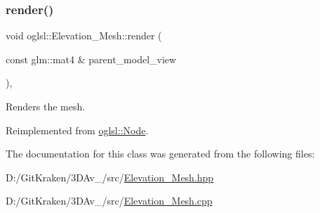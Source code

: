 \mbox{\label{classoglsl_1_1_elevation___mesh_afb39dc1633680dccabb4b8da72ac4733}} 
\subsubsection{\texorpdfstring{render()}{render()}}
{\footnotesize\ttfamily void oglsl\+::\+Elevation\+\_\+\+Mesh\+::render (\begin{DoxyParamCaption}\item[{const glm\+::mat4 \&}]{parent\+\_\+model\+\_\+view }\end{DoxyParamCaption})\hspace{0.3cm}{\ttfamily [override]}, {\ttfamily [virtual]}}



Renders the mesh. 



Reimplemented from \mbox{\hyperlink{classoglsl_1_1_node_a09545b18a2d798327601a6251c091444}{oglsl\+::\+Node}}.



The documentation for this class was generated from the following files\+:\begin{DoxyCompactItemize}
\item 
D\+:/\+Git\+Kraken/3\+D\+Av\+\_/src/\mbox{\hyperlink{_elevation___mesh_8hpp}{Elevation\+\_\+\+Mesh.\+hpp}}\item 
D\+:/\+Git\+Kraken/3\+D\+Av\+\_/src/\mbox{\hyperlink{_elevation___mesh_8cpp}{Elevation\+\_\+\+Mesh.\+cpp}}\end{DoxyCompactItemize}
